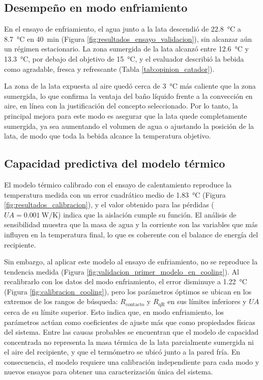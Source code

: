 \documentclass[12pt, a4paper]{article}
\begin{document}
\subsection{Desempeño en modo enfriamiento}

En el ensayo de enfriamiento, el agua junto a la lata descendió de \SI{22,8}{\celsius} a \SI{8,7}{\celsius} en \SI{40}{\minute} (Figura \ref{fig:resultados_ensayo_validacion}), sin alcanzar aún un régimen estacionario. La zona sumergida de la lata alcanzó entre \SI{12,6}{\celsius} y \SI{13,3}{\celsius}, por debajo del objetivo de \SI{15}{\celsius}, y el evaluador describió la bebida como agradable, fresca y refrescante (Tabla \ref{tab:opinion_catador}).

La zona de la lata expuesta al aire quedó cerca de \SI{3}{\celsius} más caliente que la zona sumergida, lo que confirma la ventaja del baño líquido frente a la convección en aire, en línea con la justificación del concepto seleccionado. Por lo tanto, la principal mejora para este modo es asegurar que la lata quede completamente sumergida, ya sea aumentando el volumen de agua o ajustando la posición de la lata, de modo que toda la bebida alcance la temperatura objetivo.

\subsection{Capacidad predictiva del modelo térmico}

El modelo térmico calibrado con el ensayo de calentamiento reproduce la temperatura medida con un error cuadrático medio de \SI{1,83}{\celsius} (Figura \ref{fig:resultados_calibracion}), y el valor obtenido para las pérdidas ($UA = \SI{0,001}{\watt\per\kelvin}$) indica que la aislación cumple su función. El análisis de sensibilidad muestra que la masa de agua y la corriente son las variables que más influyen en la temperatura final, lo que es coherente con el balance de energía del recipiente.

Sin embargo, al aplicar este modelo al ensayo de enfriamiento, no se reproduce la tendencia medida (Figura \ref{fig:validacion_primer_modelo_en_cooling}). Al recalibrarlo con los datos del modo enfriamiento, el error disminuye a \SI{1,22}{\celsius} (Figura \ref{fig:calibracion_cooling}), pero los parámetros óptimos se ubican en los extremos de los rangos de búsqueda: $R_{\text{contacto}}$ y $R_{\text{qR}}$ en sus límites inferiores y $UA$ cerca de su límite superior. Esto indica que, en modo enfriamiento, los parámetros actúan como coeficientes de ajuste más que como propiedades físicas del sistema. Entre las causas probables se encuentran que el modelo de capacidad concentrada no representa la masa térmica de la lata parcialmente sumergida ni el aire del recipiente, y que el termómetro se ubicó junto a la pared fría. En consecuencia, el modelo requiere una calibración independiente para cada modo y nuevos ensayos para obtener una caracterización única del sistema.
\end{document}
